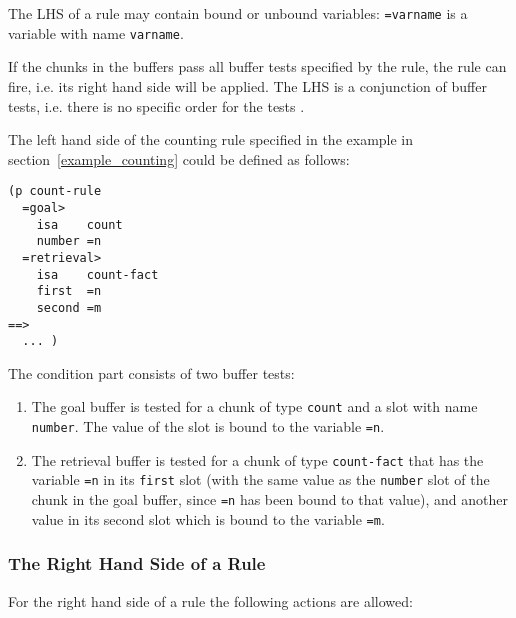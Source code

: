 The LHS of a rule may contain bound or unbound variables: \verb|=varname| is a variable with name \verb|varname|.

If the chunks in the buffers pass all buffer tests specified by the rule, the rule can fire, i.e. its right hand side will be applied. The LHS is a conjunction of buffer tests, i.e. there is no specific order for the tests \cite[p. 165]{actr_reference}.

\begin{example}
The left hand side of the counting rule specified in the example in section~\ref{example_counting} could be defined as follows:

\begin{lstlisting}
(p count-rule
  =goal> 
    isa    count
    number =n
  =retrieval>
    isa    count-fact
    first  =n
    second =m
==>
  ... )
\end{lstlisting}

The condition part consists of two buffer tests:

\begin{enumerate}
 \item The goal buffer is tested for a chunk of type \verb|count| and a slot with name \verb|number|. The value of the slot is bound to the variable \verb|=n|.
 \item The retrieval buffer is tested for a chunk of type \verb|count-fact| that has the variable \verb|=n| in its \verb|first| slot (with the same value as the \verb|number| slot of the chunk in the goal buffer, since \verb|=n| has been bound to that value), and another value in its second slot which is bound to the variable \verb|=m|.
\end{enumerate}

\end{example}

\subsubsection{The Right Hand Side of a Rule}

For the right hand side of a rule the following actions are allowed:

